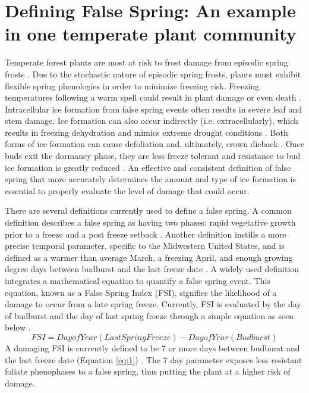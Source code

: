 \documentclass{article}\usepackage[]{graphicx}\usepackage[]{color}
\begin{document}
\section{Defining False Spring: An example in one temperate plant community}
Temperate forest plants are most at risk to frost damage from episodic spring frosts \citep{Sakai1987}. Due to the stochastic nature of episodic spring frosts, plants must exhibit flexible spring phenologies in order to minimize freezing risk. Freezing temperatures following a warm spell could result in plant damage or even death \citep{Ludlum1968, Mock2007}. Intracellular ice formation from false spring events often results in severe leaf and stem damage. Ice formation can also occur indirectly (i.e. extracellularly), which results in freezing dehydration and mimics extreme drought conditions \citep{Pearce2001, Beck2004, Hofmann2015}. Both forms of ice formation can cause defoliation and, ultimately, crown dieback \citep{Gu2008}. Once buds exit the dormancy phase, they are less freeze tolerant and resistance to bud ice formation is greatly reduced \citep{Taschler2004, Lenz2013, Vitasse2014}. An effective and consistent definition of false spring that more accurately determines the amount and type of ice formation is essential to properly evaluate the level of damage that could occur.

There are several definitions currently used to define a false spring. A common definition describes a false spring as having two phases: rapid vegetative growth prior to a freeze and a post freeze setback \citep{Gu2008}. Another definition instills a more precise temporal parameter, specific to the Midwestern United States, and is defined as a warmer than average March, a freezing April, and enough growing degree days between budburst and the last freeze date \citep{Augspurger2013}. A widely used definition integrates a mathematical equation to quantify a false spring event. This equation, known as a False Spring Index (FSI), signifies the likelihood of a damage to occur from a late spring freeze. Currently, FSI is evaluated by the day of budburst and the day of last spring freeze through a simple equation as seen below \citep{Marino2011}. 
\begin{equation} \label{eq:1}
FSI = Day of Year (Last Spring Freeze) - Day of Year (Budburst)
\end{equation}
A damaging FSI is currently defined to be 7 or more days between budburst and the last freeze date (Equation \ref{eq:1}) \citep{Peterson2014}. The 7 day parameter exposes less resistant foliate phenophases to a false spring, thus putting the plant at a higher risk of damage. 
\end{document}
